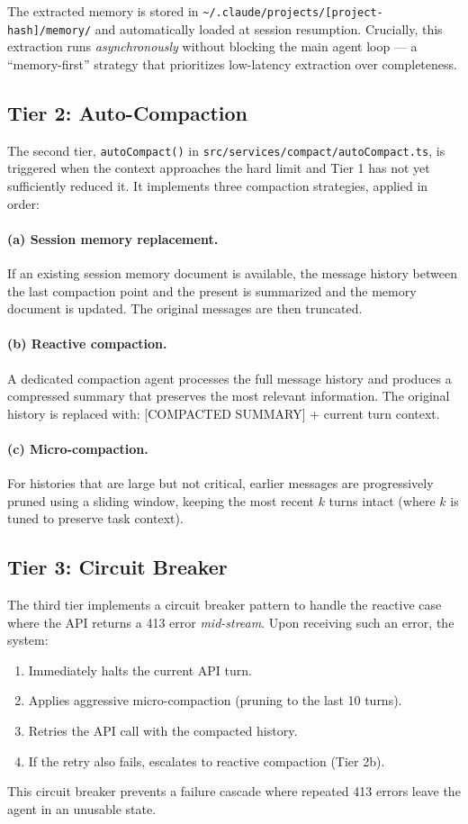\documentclass{article}
\begin{document}
The extracted memory is stored in \texttt{\textasciitilde/.claude/projects/[project-hash]/memory/} and automatically loaded at session resumption. Crucially, this extraction runs \emph{asynchronously} without blocking the main agent loop --- a ``memory-first'' strategy that prioritizes low-latency extraction over completeness.

\subsection{Tier 2: Auto-Compaction}

The second tier, \texttt{autoCompact()} in \texttt{src/services/compact/autoCompact.ts}, is triggered when the context approaches the hard limit and Tier 1 has not yet sufficiently reduced it. It implements three compaction strategies, applied in order:

\paragraph{(a) Session memory replacement.} If an existing session memory document is available, the message history between the last compaction point and the present is summarized and the memory document is updated. The original messages are then truncated.

\paragraph{(b) Reactive compaction.} A dedicated compaction agent processes the full message history and produces a compressed summary that preserves the most relevant information. The original history is replaced with: [COMPACTED SUMMARY] + current turn context.

\paragraph{(c) Micro-compaction.} For histories that are large but not critical, earlier messages are progressively pruned using a sliding window, keeping the most recent $k$ turns intact (where $k$ is tuned to preserve task context).

\subsection{Tier 3: Circuit Breaker}

The third tier implements a circuit breaker pattern to handle the reactive case where the API returns a 413 error \emph{mid-stream}. Upon receiving such an error, the system:
\begin{enumerate}
  \item Immediately halts the current API turn.
  \item Applies aggressive micro-compaction (pruning to the last 10 turns).
  \item Retries the API call with the compacted history.
  \item If the retry also fails, escalates to reactive compaction (Tier 2b).
\end{enumerate}
This circuit breaker prevents a failure cascade where repeated 413 errors leave the agent in an unusable state.
\end{document}
